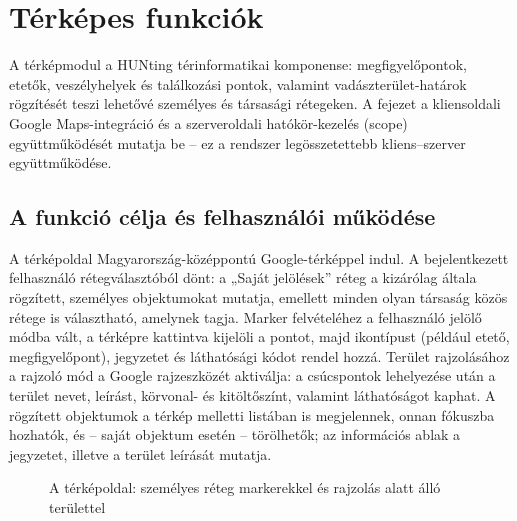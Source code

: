 
\chapter{Térképes funkciók}
\label{chap:terkep}

A térképmodul a HUNting térinformatikai komponense: megfigyelőpontok, etetők, veszélyhelyek és
találkozási pontok, valamint vadászterület-határok rögzítését teszi lehetővé személyes és
társasági rétegeken. A fejezet a kliensoldali Google Maps-integráció és a szerveroldali
hatókör-kezelés (scope) együttműködését mutatja be -- ez a rendszer legösszetettebb
kliens--szerver együttműködése.

\section{A funkció célja és felhasználói működése}
\label{sec:map-cel}

A térképoldal Magyarország-középpontú Google-térképpel indul. A bejelentkezett felhasználó
rétegválasztóból dönt: a „Saját jelölések” réteg a kizárólag általa rögzített, személyes
objektumokat mutatja, emellett minden olyan társaság közös rétege is választható, amelynek tagja.
Marker felvételéhez a felhasználó jelölő módba vált, a térképre kattintva kijelöli a pontot, majd
ikontípust (például etető, megfigyelőpont), jegyzetet és láthatósági kódot rendel hozzá. Terület
rajzolásához a rajzoló mód a Google rajzeszközét aktiválja: a csúcspontok lehelyezése után a
terület nevet, leírást, körvonal- és kitöltőszínt, valamint láthatóságot kaphat. A rögzített
objektumok a térkép melletti listában is megjelennek, onnan fókuszba hozhatók, és -- saját
objektum esetén -- törölhetők; az információs ablak a jegyzetet, illetve a terület leírását
mutatja.

\begin{figure}[htbp]
	\centering
	\caption{A térképoldal: személyes réteg markerekkel és rajzolás alatt álló területtel}
	\label{fig:map-screen}
\end{figure}

